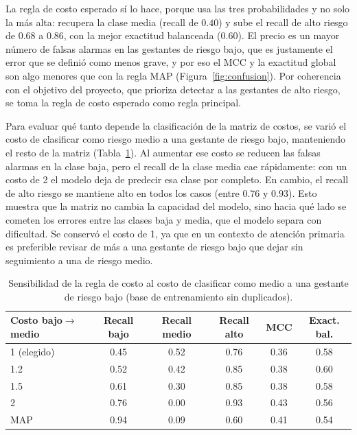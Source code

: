La regla de costo esperado sí lo hace, porque usa las tres probabilidades y no
solo la más alta: recupera la clase media (recall de $0.40$) y sube el recall de
alto riesgo de $0.68$ a $0.86$, con la mejor exactitud balanceada ($0.60$). El
precio es un mayor número de falsas alarmas en las gestantes de riesgo bajo, que
es justamente el error que se definió como menos grave, y por eso el MCC y la
exactitud global son algo menores que con la regla MAP (Figura~\ref{fig:confusion}).
Por coherencia con el objetivo del proyecto, que prioriza detectar a las
gestantes de alto riesgo, se toma la regla de costo esperado como regla principal.

Para evaluar qué tanto depende la clasificación de la matriz de costos, se
varió el costo de clasificar como riesgo medio a una gestante de riesgo bajo,
manteniendo el resto de la matriz (Tabla~\ref{tab:sensibilidad_costo}). Al
aumentar ese costo se reducen las falsas alarmas en la clase baja, pero el
recall de la clase media cae rápidamente: con un costo de 2 el modelo deja de
predecir esa clase por completo. En cambio, el recall de alto riesgo se
mantiene alto en todos los casos (entre $0.76$ y $0.93$). Esto muestra que la
matriz no cambia la capacidad del modelo, sino hacia qué lado se cometen los
errores entre las clases baja y media, que el modelo separa con dificultad. Se
conservó el costo de 1, ya que en un contexto de atención primaria es
preferible revisar de más a una gestante de riesgo bajo que dejar sin
seguimiento a una de riesgo medio.

\begin{table}[h]
\centering
\caption{Sensibilidad de la regla de costo al costo de clasificar como medio a una gestante de riesgo bajo (base de entrenamiento sin duplicados).}
\label{tab:sensibilidad_costo}
\small
\begin{tabular}{lccccc}
\toprule
Costo bajo$\to$medio & Recall bajo & Recall medio & Recall alto & MCC & Exact. bal.\\
\midrule
1 (elegido) & 0.45 & 0.52 & 0.76 & 0.36 & 0.58\\
1.2         & 0.52 & 0.42 & 0.85 & 0.38 & 0.60\\
1.5         & 0.61 & 0.30 & 0.85 & 0.38 & 0.58\\
2           & 0.76 & 0.00 & 0.93 & 0.43 & 0.56\\
MAP         & 0.94 & 0.09 & 0.60 & 0.41 & 0.54\\
\bottomrule
\end{tabular}
\end{table}

